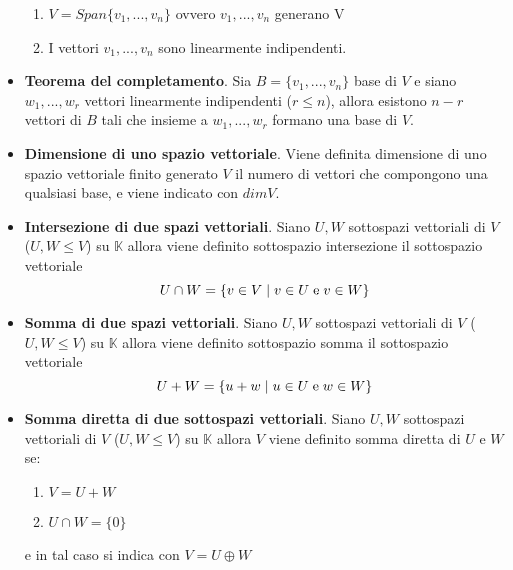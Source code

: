 \documentclass[12pt,a4paper,oneside]{book}
\begin{document}
\begin{itemize}
	  \begin{enumerate}
	  \item $V = Span\{v_1, ..., v_n\}$ ovvero $v_1, ..., v_n$ generano V
	  \item I vettori $v_1, ..., v_n$ sono linearmente indipendenti.
	  \end{enumerate}

\item \textbf{Teorema del completamento}. \linebreak
	  Sia $B = \{v_1, ..., v_n\}$ base di $V$ e siano $w_1, ..., w_r$ vettori linearmente indipendenti 
	  ($r\leq n$), allora esistono $n-r$ vettori di $B$ tali che insieme a $w_1, ..., w_r$ formano una 
	  base di $V$.

\item \textbf{Dimensione di uno spazio vettoriale}. \linebreak
	  Viene definita dimensione di uno spazio vettoriale finito generato $V$ il numero di vettori che 
	  compongono una qualsiasi base, e viene indicato con $dimV$.

\item \textbf{Intersezione di due spazi vettoriali}. \linebreak
	  Siano $U, W$ sottospazi vettoriali di $V$ ($U, W \leq V$) su $\mathbb{K}$ allora viene definito 
	  sottospazio intersezione il sottospazio vettoriale \hfill \break
	  $$U \cap W = \{v \in V \hspace{0.1cm}|\hspace{0.1cm} v\in U \text{\hspace{0.1cm}e\hspace{0.1cm}} v
	  \in W\}$$

\item \textbf{Somma di due spazi vettoriali}. \linebreak
	  Siano $U, W$ sottospazi vettoriali di $V$ ($U, W \leq V$) su $\mathbb{K}$ allora viene definito 
	  sottospazio somma il sottospazio vettoriale
	  $$U + W = \{u + w \hspace{0.1cm}|\hspace{0.1cm} u\in U \text{\hspace{0.1cm}e\hspace{0.1cm}} w\in W
	  \}$$
	
\item \textbf{Somma diretta di due sottospazi vettoriali}. \linebreak
	  Siano $U, W$ sottospazi vettoriali di $V$ ($U, W \leq V$) su $\mathbb{K}$ allora $V$ viene definito
	  somma diretta di $U$ e $W$ se:
	  
	  \begin{enumerate}
	  \item $V = U + W$
	  \item $U \cap W = \{0\}$
	  \end{enumerate}
	  
	  e in tal caso si indica con $V = U \oplus W$


\end{itemize}
\end{document}
